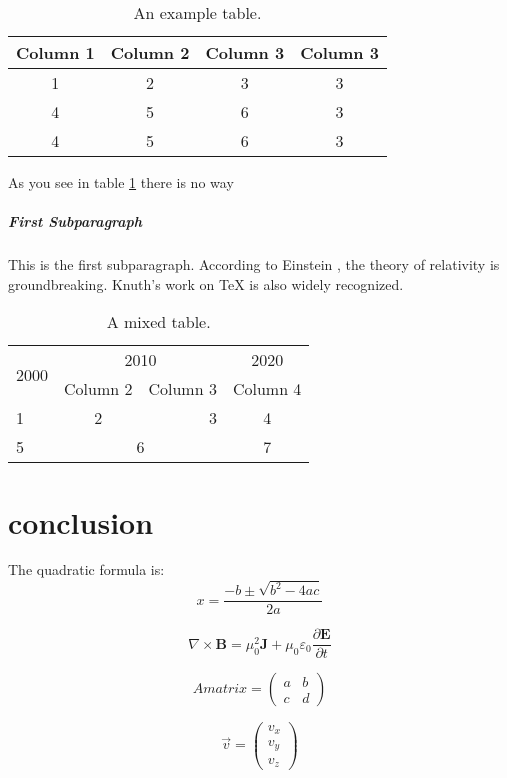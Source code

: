 \documentclass{article} %
\begin{document}
\begin{table}[h]
    \centering
    \caption{An example table.}      
    \begin{tabular}{cccc}
      \toprule
      \rowcolor{gray!50} %
      Column 1 & Column 2 & Column 3 & Column 3 \\
      \midrule
      1 & 2 & 3 & 3 \\
      4 & 5 & 6 & 3 \\
      4 & 5 & 6 & 3 \\
      \bottomrule
    \end{tabular}
    \label{tab:test} %
  \end{table}
As you see in table \ref{tab:test} there is no way
\subparagraph{First Subparagraph}
This is the first subparagraph.
According to Einstein \cite{einstein1905}, the theory of relativity is groundbreaking. %
Knuth's work on TeX \cite{knuth1984} is also widely recognized.

\begin{table}[h]
    \centering
    \caption{A mixed table.} 
    \begin{tabular}{|l|c|r|c|} %
        \hline
        \multirow{2}{*}{2000} & \multicolumn{2}{c|}{2010} & 2020 \\
        \cline{2-4} %
        & Column 2 & Column 3 & Column 4 \\
        \hline
        1 & 2 & 3 & 4 \\
        \hline
        5 & \multicolumn{2}{c|}{6} & 7 \\
        \hline
    \end{tabular}
\end{table}

\section{conclusion}
\par
The quadratic formula is:
\[
x = \frac{-b \pm \sqrt{b^2 - 4ac}}{2a}
\]

\par
\[
\nabla \times \mathbf{B} = \mu_0^2 \mathbf{J} + \mu_0 \varepsilon_0 \frac{\partial \mathbf{E}}{\partial t}
\]

\[
  A matrix= 
\begin{pmatrix}
a & b \\
c & d
\end{pmatrix}
\]

\[
\vec{v} = \begin{pmatrix}
  v_x \\
  v_y \\
  v_z
  \end{pmatrix}
\]

\newpage
\printbibliography
\end{document}
